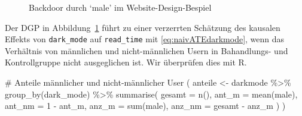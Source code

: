 \documentclass[
  a4paper,
  DIV=11,
  oneside]{scrreprt}
\newenvironment{Shaded}{\begin{snugshade}}{\end{snugshade}}
\newcommand{\AttributeTok}[1]{\textcolor[rgb]{0.40,0.45,0.13}{#1}}
\newcommand{\CommentTok}[1]{\textcolor[rgb]{0.37,0.37,0.37}{#1}}
\newcommand{\DecValTok}[1]{\textcolor[rgb]{0.68,0.00,0.00}{#1}}
\newcommand{\FunctionTok}[1]{\textcolor[rgb]{0.28,0.35,0.67}{#1}}
\newcommand{\NormalTok}[1]{\textcolor[rgb]{0.00,0.23,0.31}{#1}}
\newcommand{\OtherTok}[1]{\textcolor[rgb]{0.00,0.23,0.31}{#1}}
\newcommand{\SpecialCharTok}[1]{\textcolor[rgb]{0.37,0.37,0.37}{#1}}
\begin{document}
\begin{figure}[t]


\caption{\label{fig-maleCDdarkmode}Backdoor durch `male' im
Website-Design-Bespiel}

\end{figure}%

Der DGP in Abbildung~\ref{fig-maleCDdarkmode} führt zu einer verzerrten
Schätzung des kausalen Effekts von \texttt{dark\_mode} auf
\texttt{read\_time} mit \eqref{eq:naivATEdarkmode}, wenn das Verhältnis
von männlichen und nicht-männlichen Usern in Bahandlungs- und
Kontrollgruppe nicht ausgeglichen ist. Wir überprüfen dies mit R.

\begin{Shaded}
\begin{Highlighting}[]
\CommentTok{\# Anteile männlicher und nicht{-}männlicher User}
\NormalTok{(}
\NormalTok{  anteile }\OtherTok{\textless{}{-}}\NormalTok{ darkmode }\SpecialCharTok{\%\textgreater{}\%} 
  \FunctionTok{group\_by}\NormalTok{(dark\_mode) }\SpecialCharTok{\%\textgreater{}\%} 
  \FunctionTok{summarise}\NormalTok{(}
    \AttributeTok{gesamt =} \FunctionTok{n}\NormalTok{(),}
    \AttributeTok{ant\_m =} \FunctionTok{mean}\NormalTok{(male),}
    \AttributeTok{ant\_nm =} \DecValTok{1} \SpecialCharTok{{-}}\NormalTok{ ant\_m,}
    \AttributeTok{anz\_m =} \FunctionTok{sum}\NormalTok{(male),}
    \AttributeTok{anz\_nm =}\NormalTok{ gesamt }\SpecialCharTok{{-}}\NormalTok{ anz\_m}
\NormalTok{    )}
\NormalTok{)}
\end{Highlighting}
\end{Shaded}
\end{document}
